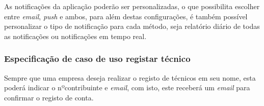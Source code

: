As notificações da aplicação poderão ser personalizadas, o que possibilita escolher entre \textit{email}, \textit{push} e ambos,
para além destas configurações, é também possível personalizar o tipo de notificação para cada método, seja relatório diário de todas as notificações ou notificações em tempo real.



\subsubsection{Especificação de caso de uso registar técnico}

Sempre que uma empresa deseja realizar o registo de técnicos em seu nome, esta poderá indicar o nºcontribuinte e \textit{email}, com isto, este receberá um \textit{email} para confirmar o registo de conta.






% 




% 



